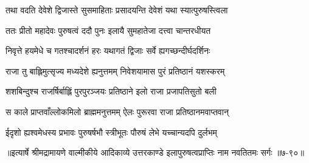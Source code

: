 \twolineshloka
{तथा वदति देवेशे द्विजास्ते सुसमाहिताः}
{प्रसादयन्ति देवेशं यथा स्यात्पुरुषस्त्विला} %

\twolineshloka
{ततः प्रीतो महादेवः पुरुषत्वं ददौ पुनः}
{इलायै सुमहातेजा दत्त्वा चान्तरधीयत} %

\twolineshloka
{निवृत्ते हयमेधे च गतश्चादर्शनं हरः}
{यथागतं द्विजाः सर्वे ह्यगच्छन्दीर्घदर्शिनः} %

\twolineshloka
{राजा तु बाह्लिमुत्सृज्य मध्यदेशे ह्यनुत्तमम्}
{निवेशयामास पुरं प्रतिष्ठानं यशस्करम्} %

\twolineshloka
{शशबिन्दुश्च राजर्षिर्बाह्लिं पुरपुरञ्जयः}
{प्रतिष्ठाने इलो राजा प्रजापतिसुतो बली} %

\twolineshloka
{स काले प्राप्तवाँल्लोकमिलो ब्राह्ममनुत्तमम्}
{ऐलः पुरूरवा राजा प्रतिष्ठानमवाप्तवान्} %

\twolineshloka
{ईदृशो ह्यश्वमेधस्य प्रभावः पुरुषर्षभौ}
{स्त्रीभूतः पौरुषं लेभे यच्चान्यदपि दुर्लभम्} %


॥इत्यार्षे श्रीमद्रामायणे वाल्मीकीये आदिकाव्ये उत्तरकाण्डे इलापुरुषत्वप्राप्तिः नाम नवतितमः सर्गः ॥७-९०॥
